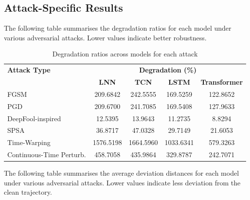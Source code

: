 \subsection*{Attack-Specific Results}

The following table summarises the degradation ratios for each model under various adversarial attacks. Lower values indicate better robustness.

\begin{table}[H]
    \centering
    \small
    \begin{tabular}{|l|cccc|}
    \hline
    \textbf{Attack Type} & \multicolumn{4}{c|}{\textbf{Degradation (\%)}} \\
    \cline{2-5}
     & \textbf{LNN} & \textbf{TCN} & \textbf{LSTM} & \textbf{Transformer} \\
    \hline
    FGSM                     & 209.6842 & 242.5555 & 169.5259 & 122.8652 \\
    PGD                      & 209.6700 & 241.7085 & 169.5408 & 127.9633 \\
    DeepFool-inspired        & 12.5395 & 13.9643 & 11.2735 & 8.8294 \\
    SPSA                     & 36.8717 & 47.0328 & 29.7149 & 21.6053 \\
    Time-Warping             & 1576.5198 & 1664.5960 & 1033.6341 & 579.3263 \\
    Continuous-Time Perturb. & 458.7058 & 435.9864 & 329.8787 & 242.7071 \\
    \hline
    \end{tabular}
    \caption{Degradation ratios across models for each attack}
    \label{tab:attack_results_degradation}
\end{table}

The following table summarises the average deviation distances for each model under various adversarial attacks. Lower values indicate less deviation from the clean trajectory.

